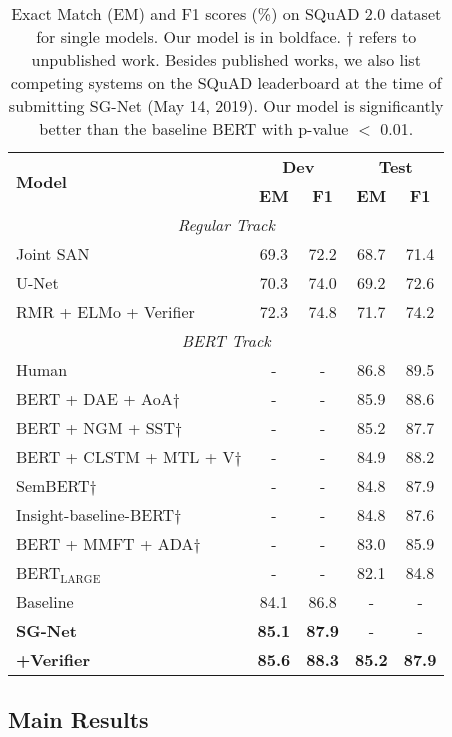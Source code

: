 \documentclass[letterpaper]{article} \usepackage{color}
\begin{document}
\begin{table}
	\centering
	\resizebox{\linewidth}{!}
	{
		\begin{tabular}{l c c c c }
			\hline
			\hline
			\multirow{2}{*}{\textbf{Model} }& \multicolumn{2}{c}{\textbf{Dev}} & \multicolumn{2}{c}{\textbf{Test}}\\
			& \textbf{EM} & \textbf{F1}&   \textbf{EM} & \textbf{F1}\\
			\hline
			\multicolumn{5}{c}{\emph{Regular Track}} \\
			Joint SAN &69.3 & 72.2 & 68.7 & 71.4\\	
			U-Net & 70.3  & 74.0  & 69.2 & 72.6 \\	
			RMR + ELMo + Verifier & 72.3  & 74.8 & 71.7 & 74.2 \\
			\hline
			\multicolumn{5}{c}{\emph{BERT Track}} \\
			Human& -  & - & 86.8&	89.5 \\
			\hdashline
			BERT + DAE + AoA$\dagger$& -  & -   & 85.9 & 88.6 \\
			BERT + NGM + SST$\dagger$& -  & - & 85.2 & 87.7\\
			BERT + CLSTM + MTL + V$\dagger$& -  & -   & 84.9 &	88.2 \\
			SemBERT$\dagger$& -  & -  & 84.8 &	87.9   \\
			Insight-baseline-BERT$\dagger$& -  & - & 84.8 &	87.6 \\
			BERT + MMFT + ADA$\dagger$& -  & -  & 83.0 & 85.9 \\
			BERT$_\text{LARGE}$ & -  & - &  82.1 &  84.8 \\
			\hline
			Baseline & 84.1  & 86.8 & -  & - \\
			\textbf{SG-Net}  & \textbf{85.1} & \textbf{87.9} & - & -\\
			\textbf{+Verifier} &  \textbf{85.6} & \textbf{88.3}  & \textbf{85.2} & \textbf{87.9}  \\

			\hline
			\hline
		\end{tabular}
	}
	\caption{\label{tab:squad2.0} Exact Match (EM) and F1 scores (\%) on SQuAD 2.0 dataset for single models. Our model is in boldface. $\dagger$ refers to unpublished work. Besides published works, we also list competing systems on the SQuAD leaderboard at the time of submitting SG-Net (May 14, 2019). Our model is significantly better than the baseline BERT with p-value $<$ 0.01.}
\end{table}
\subsection{Main Results}
\end{document}
